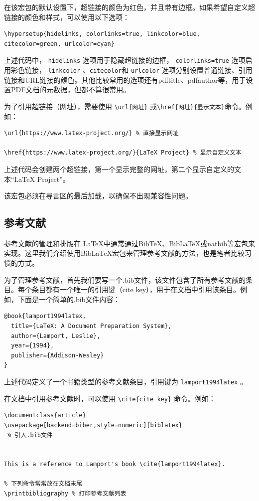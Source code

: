 在该宏包的默认设置下，超链接的颜色为红色，并且带有边框。如果希望自定义超链接的颜色和样式，可以使用以下选项：
\begin{verbatim}
\hypersetup{hidelinks, colorlinks=true, linkcolor=blue, citecolor=green, urlcolor=cyan}
\end{verbatim}
上述代码中， \verb|hidelinks| 选项用于隐藏超链接的边框， \verb|colorlinks=true| 选项启用彩色链接， \verb|linkcolor| 、\verb|citecolor|和 \verb|urlcolor| 选项分别设置普通链接、引用链接和URL链接的颜色。其他比较常用的选项还有pdftitle、pdfauthor等，用于设置PDF文档的元数据，但都不算很常用。

为了引用超链接（网址），需要使用 \verb|\url{网址}| 或\verb|\href{网址}{显示文本}|命令。例如：
\begin{verbatim}
\url{https://www.latex-project.org/} % 直接显示网址

\href{https://www.latex-project.org/}{LaTeX Project} % 显示自定义文本
\end{verbatim}
上述代码会创建两个超链接，第一个显示完整的网址，第二个显示自定义的文本“LaTeX Project”。

该宏包必须在导言区的最后加载，以确保不出现兼容性问题。

\subsection{参考文献}

参考文献的管理和排版在 \LaTeX 中通常通过BibTeX、BibLaTeX或natbib等宏包来实现。这里我们介绍使用BibLaTeX宏包来管理参考文献的方法，也是笔者比较习惯的方式。

为了管理参考文献，首先我们要写一个.bib文件，该文件包含了所有参考文献的条目。每个条目都有一个唯一的引用键（cite key），用于在文档中引用该条目。例如，下面是一个简单的.bib文件内容：
\begin{verbatim}
@book{lamport1994latex,
  title={LaTeX: A Document Preparation System},
  author={Lamport, Leslie},
  year={1994},
  publisher={Addison-Wesley}
}
\end{verbatim}
上述代码定义了一个书籍类型的参考文献条目，引用键为 \verb|lamport1994latex| 。

在文档中引用参考文献时，可以使用 \verb|\cite{cite key}| 命令。例如：
\begin{verbatim}
\documentclass{article}
\usepackage[backend=biber,style=numeric]{biblatex}
 % 引入.bib文件


This is a reference to Lamport's book \cite{lamport1994latex}.  

% 下列命令常常放在文档末尾
\printbibliography % 打印参考文献列表

\end{verbatim}

